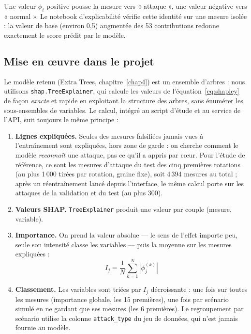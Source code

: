 Une valeur $\phi_i$ positive pousse la mesure vers « attaque », une valeur
négative vers « normal ». Le notebook d'explicabilité vérifie cette identité
sur une mesure isolée : la valeur de base (environ 0,5) augmentée des 53
contributions redonne exactement le score prédit par le modèle.

\subsection{Mise en œuvre dans le projet}

Le modèle retenu (Extra Trees, chapitre~\ref{chap4}) est un ensemble
d'arbres : nous utilisons \texttt{shap.TreeExplainer}, qui calcule les
valeurs de l'équation~\eqref{eq:shapley} de façon \emph{exacte} et rapide en
exploitant la structure des arbres, sans énumérer les sous-ensembles de
variables. Le calcul, intégré au script d'étude et au service de l'API,
suit toujours le même principe :

\begin{enumerate}
  \item \textbf{Lignes expliquées.} Seules des mesures falsifiées jamais
        vues à l'entraînement sont expliquées, hors zone de garde : on
        cherche comment le modèle \emph{reconnaît} une attaque, pas ce qu'il
        a appris par cœur. Pour l'étude de référence, ce sont les mesures
        d'attaque du test des cinq premières rotations (au plus 1\,000
        tirées par rotation, graine fixe), soit 4\,394 mesures au total ;
        après un réentraînement lancé depuis l'interface, le même calcul
        porte sur les attaques de la validation et du test (au plus 300).
  \item \textbf{Valeurs SHAP.} \texttt{TreeExplainer} produit une valeur
        par couple (mesure, variable).
  \item \textbf{Importance.} On prend la valeur absolue — le sens de
        l'effet importe peu, seule son intensité classe les variables —
        puis la moyenne sur les mesures expliquées :
        \begin{equation}
        I_j = \frac{1}{N}\sum_{k=1}^{N}\left|\phi_j^{(k)}\right|
        \label{eq:importance}
        \end{equation}
  \item \textbf{Classement.} Les variables sont triées par $I_j$
        décroissante : une fois sur toutes les mesures (importance globale,
        les 15 premières), une fois par scénario simulé en ne gardant que
        ses mesures (les 6 premières). Le regroupement par scénario utilise
        la colonne \texttt{attack\_type} du jeu de données, qui n'est jamais
        fournie au modèle.
\end{enumerate}

